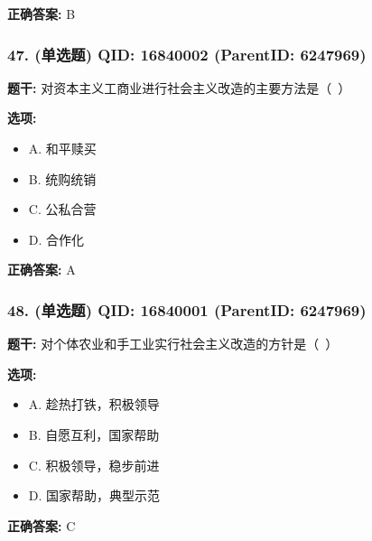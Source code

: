 \documentclass[12pt,UTF8]{ctexart}
\begin{document}
\textbf{正确答案:}
B

\vspace{0.3em}\hrulefill\vspace{0.7em}

\subsubsection*{47. (单选题) \small QID: 16840002 (ParentID: 6247969)}

\textbf{题干:}
对资本主义工商业进行社会主义改造的主要方法是（ ）



\textbf{选项:}
\begin{itemize}[leftmargin=*]

  \item A. 和平赎买

  \item B. 统购统销

  \item C. 公私合营

  \item D. 合作化

\end{itemize}

\textbf{正确答案:}
A

\vspace{0.3em}\hrulefill\vspace{0.7em}

\subsubsection*{48. (单选题) \small QID: 16840001 (ParentID: 6247969)}

\textbf{题干:}
对个体农业和手工业实行社会主义改造的方针是（ ）



\textbf{选项:}
\begin{itemize}[leftmargin=*]

  \item A. 趁热打铁，积极领导

  \item B. 自愿互利，国家帮助

  \item C. 积极领导，稳步前进

  \item D. 国家帮助，典型示范

\end{itemize}

\textbf{正确答案:}
C
\end{document}

